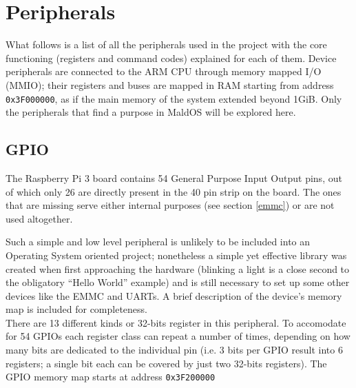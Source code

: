 \documentclass[12pt,a4paper,openright,twoside]{report}
\begin{document}
\section{Peripherals}
What follows is a list of all the peripherals used in the project with the core
functioning (registers and command codes) explained for each of them.
Device peripherals are connected to the ARM CPU through memory mapped I/O (MMIO);
their registers and buses are mapped in RAM starting from address {\tt 0x3F000000},
as if the main memory of the system extended beyond 1GiB.
Only the peripherals that find a purpose in MaldOS will be explored here.

\subsection{GPIO}
The Raspberry Pi 3 board contains 54 General Purpose Input Output pins, out of which
only 26 are directly present in the 40 pin strip on the board. The ones that are
missing serve either internal purposes (see section \ref{emmc}) or are not used
altogether.

Such a simple and low level peripheral is unlikely
 to be included into an Operating System oriented project; nonetheless a simple yet effective 
library was created when first approaching the hardware (blinking a light 
is a close second to the obligatory ``Hello World'' example) and is still necessary
to set up some other devices like the EMMC and UARTs.
A brief description of the device's memory map is included for completeness.
\\
There are 13 different kinds or 32-bits register in this peripheral. To accomodate for
54 GPIOs each register class can repeat a number of times, depending on how
many bits are dedicated to the individual pin (i.e. 3 bits per GPIO result into 6
registers; a single bit each can be covered by just two 32-bits registers).
The GPIO memory map starts at address {\tt 0x3F200000}
\end{document}
